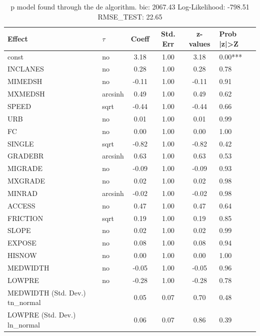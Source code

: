 \begin{table}
	\caption{p model found through the de algorithm. bic: 2067.43 Log-Likelihood: -798.51 RMSE_TEST: 22.65}
	\begin{center}
		\begin{tabular}{|l|l|c|c|c|l|}
			\hline
			Effect & $\tau$ & Coeff & Std. Err & z-values & Prob |z|>Z \\
			\hline
			const & no & 3.18 & 1.00 & 3.18 & 0.00*** \\
			\hline
			INCLANES & no & 0.28 & 1.00 & 0.28 & 0.78 \\
			\hline
			MIMEDSH & no & -0.11 & 1.00 & -0.11 & 0.91 \\
			\hline
			MXMEDSH & arcsinh & 0.49 & 1.00 & 0.49 & 0.62 \\
			\hline
			SPEED & sqrt & -0.44 & 1.00 & -0.44 & 0.66 \\
			\hline
			URB & no & 0.01 & 1.00 & 0.01 & 0.99 \\
			\hline
			FC & no & 0.00 & 1.00 & 0.00 & 1.00 \\
			\hline
			SINGLE & sqrt & -0.82 & 1.00 & -0.82 & 0.42 \\
			\hline
			GRADEBR & arcsinh & 0.63 & 1.00 & 0.63 & 0.53 \\
			\hline
			MIGRADE & no & -0.09 & 1.00 & -0.09 & 0.93 \\
			\hline
			MXGRADE & no & 0.02 & 1.00 & 0.02 & 0.98 \\
			\hline
			MINRAD & arcsinh & -0.02 & 1.00 & -0.02 & 0.98 \\
			\hline
			ACCESS & no & 0.47 & 1.00 & 0.47 & 0.64 \\
			\hline
			FRICTION & sqrt & 0.19 & 1.00 & 0.19 & 0.85 \\
			\hline
			SLOPE & no & 0.02 & 1.00 & 0.02 & 0.99 \\
			\hline
			EXPOSE & no & 0.08 & 1.00 & 0.08 & 0.94 \\
			\hline
			HISNOW & no & 0.00 & 1.00 & 0.00 & 1.00 \\
			\hline
			MEDWIDTH & no & -0.05 & 1.00 & -0.05 & 0.96 \\
			\hline
			LOWPRE & no & -0.28 & 1.00 & -0.28 & 0.78 \\
			\hline
			MEDWIDTH (Std. Dev.) tn_normal &  & 0.05 & 0.07 & 0.70 & 0.48 \\
			\hline
			LOWPRE (Std. Dev.) ln_normal &  & 0.06 & 0.07 & 0.86 & 0.39 \\
			\hline
		\end{tabular}
	\end{center}
\end{table}